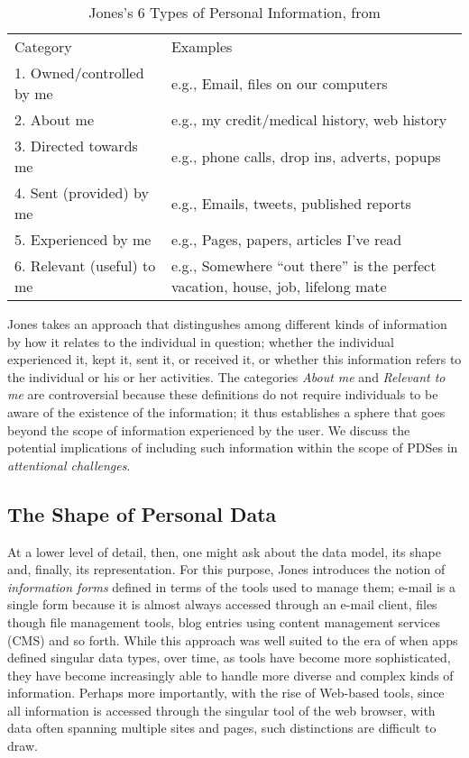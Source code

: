 \documentclass[runningheads,a4paper]{llncs}
\begin{document}
\begin{table}
\begin{tabular}{p{4cm} p{8cm}} 
Category & Examples \\
1. Owned/controlled by me & e.g., Email, files on our computers  \\
2. About me	& e.g., my credit/medical history, web history \\
3. Directed towards me & e.g., phone calls, drop ins, adverts, popups \\
4. Sent (provided) by me & e.g.,  Emails, tweets, published reports  \\
5. Experienced by me & e.g.,  Pages, papers, articles I’ve read \\
6. Relevant (useful) to me	& e.g.,  Somewhere ``out there'' is the perfect vacation, house, job, lifelong mate \\
\end{tabular}
\caption{Jones's 6 Types of Personal Information, from \cite{kftf}}
\label{fig:jonestype}
\end{table}

Jones takes an approach that distingushes among different kinds of information by how it relates to the individual in question; whether the individual experienced it, kept it, sent it, or received it, or whether this information refers to the individual or his or her activities.  The categories \emph{About me} and \emph{Relevant to me} are controversial because these definitions do not require individuals to be aware of the existence of the information; it thus establishes a sphere that goes beyond the scope of information experienced by the user.  We discuss the potential implications of including such information within the scope of PDSes in \emph{attentional challenges}. 

\subsection{The Shape of Personal Data}

At a lower level of detail, then, one might ask about the data model, its shape and, finally, its representation.  For this purpose, Jones introduces the notion of \emph{information forms} defined in terms of the tools used to manage them; e-mail is a single form because it is almost always accessed through an e-mail client, files though file management tools, blog entries using content management services (CMS) and so forth.  While this approach was well suited to the era of when apps defined singular data types, over time, as tools have become more sophisticated, they have become increasingly able to handle more diverse and complex kinds of information.  Perhaps more importantly, with the rise of Web-based tools, since all information is accessed through the singular tool of the web browser, with data often spanning multiple sites and pages, such distinctions are difficult to draw.
\end{document}
